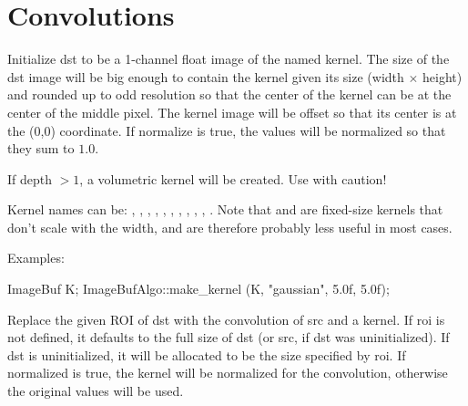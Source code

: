 \begin{comment}
\apiitem{bool {\ce histogram_draw} (ImageBuf \&dst, 
  \bigspc const std::vector<imagesize_t> \&histogram)}
\index{ImageBufAlgo!histogram_draw} \indexapi{histogram_draw}
\smallskip
\noindent Examples:
\begin{code}
\end{code}
\apiend
\end{comment}


\section{Convolutions}
\label{sec:iba:convolutions}

 
Initialize {\cf dst} to be a 1-channel {\cf float} image of the named kernel.
The size of the {\cf dst} image will be big enough to contain the kernel
given its size ({\cf width} $\times$ {\cf height})
and rounded up to odd resolution so
that the center of the kernel can be at the center of the middle
pixel.  The kernel image will be offset so that its center is at the
{\cf (0,0)} coordinate.  If {\cf normalize} is true, the values will be
normalized so that they sum to $1.0$.

If {\cf depth} $> 1$, a volumetric kernel will be created.  Use with
caution!

Kernel names can be: , , ,
, , , ,
, , , . Note that
 and  are fixed-size kernels that don't
scale with the width, and are therefore probably less useful in most
cases.

\smallskip
\noindent Examples:
\begin{code}
    ImageBuf K;
    ImageBufAlgo::make_kernel (K, "gaussian", 5.0f, 5.0f);
\end{code}
\apiend

 
Replace the given ROI of {\cf dst} with the convolution of {\cf src} and
a kernel.  If {\cf roi} is not defined, it defaults to the full size
of {\cf dst} (or {\cf src}, if {\cf dst} was uninitialized).
If {\cf dst} is uninitialized,
it will be allocated to be the size specified by {\cf roi}.  If 
{\cf normalized} is {\cf true}, the kernel will be normalized for the 
convolution, otherwise the original values will be used.

